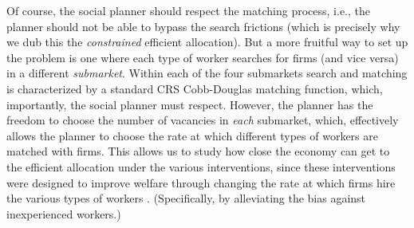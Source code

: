 \documentclass[12pt]{article} %
\theoremstyle{definition}
\begin{document}
Of course, the social planner should respect the matching process, i.e., the planner should not be able to bypass the search frictions (which is precisely why we dub this the \textit{constrained} efficient allocation). But a more fruitful way to set up the problem is one where each type of worker searches for firms (and vice versa) in a different \textit{submarket}. Within each of the four submarkets search and matching is characterized by a standard CRS Cobb-Douglas matching function, which, importantly, the social planner must respect. However, the planner has the freedom to choose the number of vacancies in \textit{each} submarket, which, effectively allows the planner to choose the rate at which different types of workers are matched with firms. This allows us to study how close the economy can get to the efficient allocation under the various interventions, since these interventions were designed to improve welfare through changing the rate at which firms hire the various types of workers . (Specifically, by alleviating the bias against inexperienced workers.) 
\end{document}
